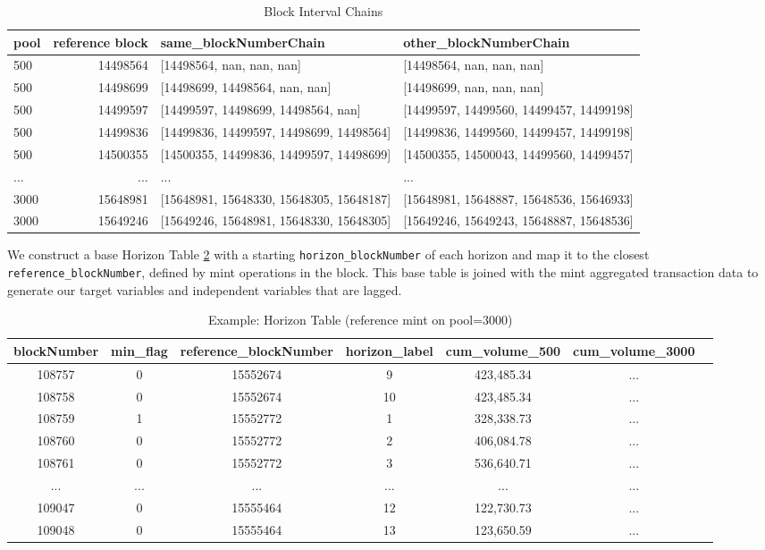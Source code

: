 \documentclass{article}
\begin{document}
\begin{table}[htbp]
  \centering
  \small
  \begin{tabularx}{\linewidth}{|X|r|l|l|}
    \hline
    \textbf{pool} & \textbf{reference block} & \textbf{same\_blockNumberChain} & \textbf{other\_blockNumberChain} \\
    \hline
    500 & 14498564 & [14498564, nan, nan, nan] & [14498564, nan, nan, nan] \\
    500 & 14498699 & [14498699, 14498564, nan, nan] & [14498699, nan, nan, nan] \\
    500 & 14499597 & [14499597, 14498699, 14498564, nan] & [14499597, 14499560, 14499457, 14499198] \\
    500 & 14499836 & [14499836, 14499597, 14498699, 14498564] & [14499836, 14499560, 14499457, 14499198] \\
    500 & 14500355 & [14500355, 14499836, 14499597, 14498699] & [14500355, 14500043, 14499560, 14499457] \\
    ... & ... & ... & ... \\
    3000 & 15648981 & [15648981, 15648330, 15648305, 15648187] & [15648981, 15648887, 15648536, 15646933] \\
    3000 & 15649246 & [15649246, 15648981, 15648330, 15648305] & [15649246, 15649243, 15648887, 15648536] \\
    \hline
  \end{tabularx}
  \caption{Block Interval Chains}
  \label{tab:chains}
\end{table}

We construct a base Horizon Table \ref{tab:horizon-table} with a starting \texttt{horizon\_blockNumber} of each horizon and map it to the closest \texttt{reference\_blockNumber}, defined by mint operations in the block. This base table is joined with the mint aggregated transaction data to generate our target variables and independent variables that are lagged.

\begin{table}[htbp]
  \centering
  \small
  \begin{tabular}{ccccccc}
    \hline
    \textbf{blockNumber} & \textbf{min\_flag} & \textbf{reference\_blockNumber} & \textbf{horizon\_label} & \textbf{cum\_volume\_500} & \textbf{cum\_volume\_3000} \\
    \hline
    108757 & 0 & 15552674 & 9 & 423,485.34 & ...\\
    108758 & 0 & 15552674 & 10 & 423,485.34 & ... \\
    108759 & 1 & 15552772 & 1 & 328,338.73 & ... \\
    108760 & 0 & 15552772 & 2 & 406,084.78 & ... \\
    108761 & 0 & 15552772 & 3 & 536,640.71 & ... \\
    ... & ... & ... & ... & ... & ... \\
    109047 & 0 & 15555464 & 12 & 122,730.73 & ... \\
    109048 & 0 & 15555464 & 13 & 123,650.59 & ... \\
    \hline
  \end{tabular}
  \caption{Example: Horizon Table (reference mint on pool=3000)}
  \label{tab:horizon-table}
\end{table}
\end{document}
